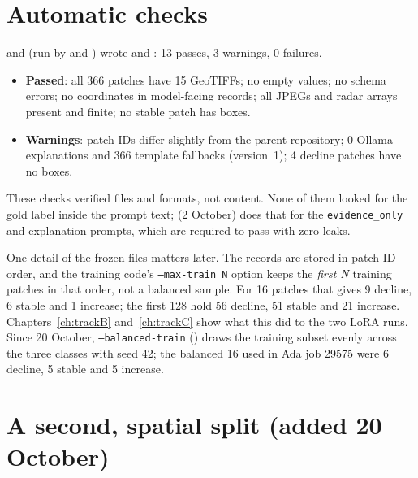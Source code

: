 \section{Automatic checks}

 and  (run by  and ) wrote  and : 13 passes, 3 warnings, 0 failures.

\begin{itemize}
  \item \textbf{Passed}: all 366 patches have 15 GeoTIFFs; no empty values; no schema errors; no coordinates in model-facing records; all JPEGs and radar arrays present and finite; no stable patch has boxes.
  \item \textbf{Warnings}: patch IDs differ slightly from the parent repository; 0 Ollama explanations and 366 template fallbacks (version~1); 4 decline patches have no boxes.
\end{itemize}

\begin{watchout}
These checks verified files and formats, not content. None of them looked for the gold label inside the prompt text;  (2 October) does that for the \texttt{evidence\_only} and explanation prompts, which are required to pass with zero leaks.
\end{watchout}

\begin{newinfo}
One detail of the frozen files matters later. The records are stored in patch-ID order, and the training code's \texttt{--max-train N} option keeps the \emph{first N} training patches in that order, not a balanced sample. For 16 patches that gives 9 decline, 6 stable and 1 increase; the first 128 hold 56 decline, 51 stable and 21 increase. Chapters~\ref{ch:trackB} and~\ref{ch:trackC} show what this did to the two LoRA runs. Since 20 October, \texttt{--balanced-train} () draws the training subset evenly across the three classes with seed 42; the balanced 16 used in Ada job 29575 were 6 decline, 5 stable and 5 increase.
\end{newinfo}

\section{A second, spatial split (added 20 October)}
\label{sec:spatialsplit}

